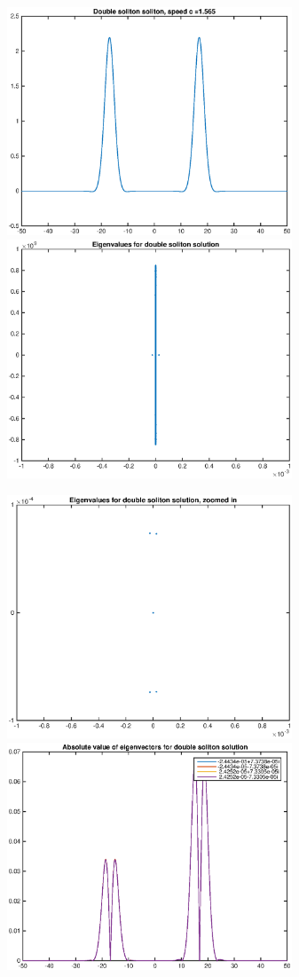 \documentclass[12pt]{article}
\begin{document}
\begin{enumerate}
\begin{figure}[H]
\includegraphics[width=8.5cm]{double3.eps}
\includegraphics[width=8.5cm]{double3eig.eps}
\end{figure}

\begin{figure}[H]
\includegraphics[width=8.5cm]{double3eigzoom.eps}
\includegraphics[width=8.5cm]{double3vecabs.eps}
\end{figure}


\end{enumerate}
\end{document}
